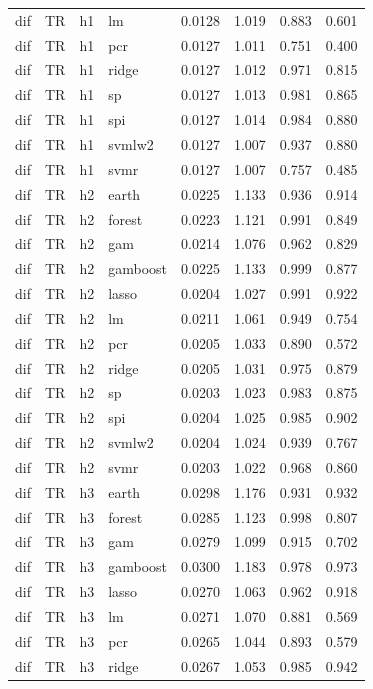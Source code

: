 \begin{ThreePartTable}
\begin{longtable}[t]{llclcccc}
dif & TR & h1 & lm & 0.0128 & 1.019 & 0.883 & 0.601\\
dif & TR & h1 & pcr & 0.0127 & 1.011 & 0.751 & 0.400\\
dif & TR & h1 & ridge & 0.0127 & 1.012 & 0.971 & 0.815\\
dif & TR & h1 & sp & 0.0127 & 1.013 & 0.981 & 0.865\\
dif & TR & h1 & spi & 0.0127 & 1.014 & 0.984 & 0.880\\
dif & TR & h1 & svmlw2 & 0.0127 & 1.007 & 0.937 & 0.880\\
dif & TR & h1 & svmr & 0.0127 & 1.007 & 0.757 & 0.485\\
\addlinespace
dif & TR & h2 & earth & 0.0225 & 1.133 & 0.936 & 0.914\\
dif & TR & h2 & forest & 0.0223 & 1.121 & 0.991 & 0.849\\
dif & TR & h2 & gam & 0.0214 & 1.076 & 0.962 & 0.829\\
dif & TR & h2 & gamboost & 0.0225 & 1.133 & 0.999 & 0.877\\
dif & TR & h2 & lasso & 0.0204 & 1.027 & 0.991 & 0.922\\
dif & TR & h2 & lm & 0.0211 & 1.061 & 0.949 & 0.754\\
dif & TR & h2 & pcr & 0.0205 & 1.033 & 0.890 & 0.572\\
dif & TR & h2 & ridge & 0.0205 & 1.031 & 0.975 & 0.879\\
dif & TR & h2 & sp & 0.0203 & 1.023 & 0.983 & 0.875\\
dif & TR & h2 & spi & 0.0204 & 1.025 & 0.985 & 0.902\\
dif & TR & h2 & svmlw2 & 0.0204 & 1.024 & 0.939 & 0.767\\
dif & TR & h2 & svmr & 0.0203 & 1.022 & 0.968 & 0.860\\
\addlinespace
dif & TR & h3 & earth & 0.0298 & 1.176 & 0.931 & 0.932\\
dif & TR & h3 & forest & 0.0285 & 1.123 & 0.998 & 0.807\\
dif & TR & h3 & gam & 0.0279 & 1.099 & 0.915 & 0.702\\
dif & TR & h3 & gamboost & 0.0300 & 1.183 & 0.978 & 0.973\\
dif & TR & h3 & lasso & 0.0270 & 1.063 & 0.962 & 0.918\\
dif & TR & h3 & lm & 0.0271 & 1.070 & 0.881 & 0.569\\
dif & TR & h3 & pcr & 0.0265 & 1.044 & 0.893 & 0.579\\
dif & TR & h3 & ridge & 0.0267 & 1.053 & 0.985 & 0.942\\

\end{longtable}
\end{ThreePartTable}
